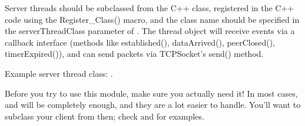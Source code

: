 Server threads should be subclassed from the 
C++ class, registered in the C++ code using the Register\_Class() macro,
and the class name should be specified in the serverThreadClass
parameter of . The thread object will receive events
via a callback interface (methods like established(), dataArrived(),
peerClosed(), timerExpired()), and can send packets via TCPSocket's send()
method.

Example server thread class: .

\begin{important}
Before you try to use this module, make sure you actually need it!
In most cases,  and  will be completely
enough, and they are a lot easier to handle. You'll want to subclass your
client from  then; check  and
 for examples.
\end{important}


